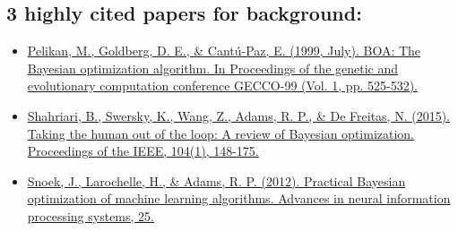 \documentclass{article}
\begin{document}
\subsection{3 highly cited papers for background:}
\begin{itemize}
\item \href{http://citeseerx.ist.psu.edu/viewdoc/download?doi=10.1.1.467.8687&rep=rep1&type=pdf}{Pelikan, M., Goldberg, D. E., \& Cantú-Paz, E. (1999, July). BOA: The Bayesian optimization algorithm. In Proceedings of the genetic and evolutionary computation conference GECCO-99 (Vol. 1, pp. 525-532).} \cite{pelikan1999boa}
\item \href{https://ieeexplore.ieee.org/abstract/document/7352306}{Shahriari, B., Swersky, K., Wang, Z., Adams, R. P., \& De Freitas, N. (2015). Taking the human out of the loop: A review of Bayesian optimization. Proceedings of the IEEE, 104(1), 148-175.} \cite{shahriari2015taking}
\item \href{https://proceedings.neurips.cc/paper/2012/file/05311655a15b75fab86956663e1819cd-Paper.pdf}{Snoek, J., Larochelle, H., \& Adams, R. P. (2012). Practical Bayesian optimization of machine learning algorithms. Advances in neural information processing systems, 25.} \cite{snoek2012practical}
\end{itemize}
\end{document}
